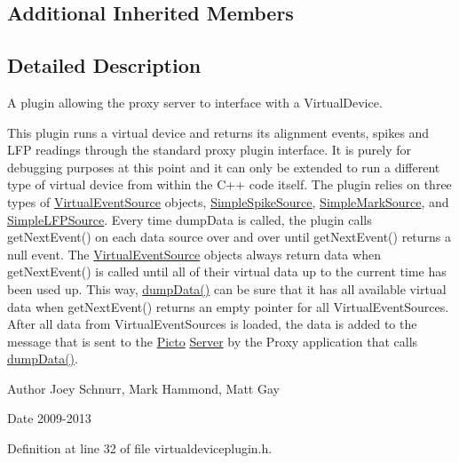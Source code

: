 \subsection*{Additional Inherited Members}


\subsection{Detailed Description}
A plugin allowing the proxy server to interface with a Virtual\-Device. 

This plugin runs a virtual device and returns its alignment events, spikes and L\-F\-P readings through the standard proxy plugin interface. It is purely for debugging purposes at this point and it can only be extended to run a different type of virtual device from within the C++ code itself. The plugin relies on three types of \hyperlink{class_virtual_event_source}{Virtual\-Event\-Source} objects, \hyperlink{class_simple_spike_source}{Simple\-Spike\-Source}, \hyperlink{class_simple_mark_source}{Simple\-Mark\-Source}, and \hyperlink{class_simple_l_f_p_source}{Simple\-L\-F\-P\-Source}. Every time dump\-Data is called, the plugin calls get\-Next\-Event() on each data source over and over until get\-Next\-Event() returns a null event. The \hyperlink{class_virtual_event_source}{Virtual\-Event\-Source} objects always return data when get\-Next\-Event() is called until all of their virtual data up to the current time has been used up. This way, \hyperlink{class_virtual_device_plugin_af350fb193b7948691aa36b32d1e9a4ef}{dump\-Data()} can be sure that it has all available virtual data when get\-Next\-Event() returns an empty pointer for all Virtual\-Event\-Sources. After all data from Virtual\-Event\-Sources is loaded, the data is added to the message that is sent to the \hyperlink{namespace_picto}{Picto} \hyperlink{class_server}{Server} by the Proxy application that calls \hyperlink{class_virtual_device_plugin_af350fb193b7948691aa36b32d1e9a4ef}{dump\-Data()}. \begin{DoxyAuthor}{Author}
Joey Schnurr, Mark Hammond, Matt Gay 
\end{DoxyAuthor}
\begin{DoxyDate}{Date}
2009-\/2013 
\end{DoxyDate}


Definition at line 32 of file virtualdeviceplugin.\-h.



